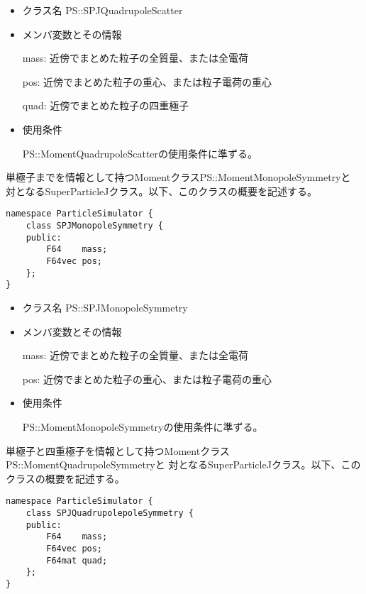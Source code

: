 \begin{itemize}
\item クラス名
  PS::SPJQuadrupoleScatter

\item メンバ変数とその情報

  mass: 近傍でまとめた粒子の全質量、または全電荷

  pos: 近傍でまとめた粒子の重心、または粒子電荷の重心
        
  quad: 近傍でまとめた粒子の四重極子

\item 使用条件

  PS::MomentQuadrupoleScatterの使用条件に準ずる。

\end{itemize}


\label{sec:SPJMonopoleSymmetry}

単極子までを情報として持つMomentクラスPS::MomentMonopoleSymmetryと
対となるSuperParticleJクラス。以下、このクラスの概要を記述する。
\begin{screen}
\begin{verbatim}
namespace ParticleSimulator {
    class SPJMonopoleSymmetry {
    public:
        F64    mass;
        F64vec pos;
    };
}
\end{verbatim}
\end{screen}

\begin{itemize}
\item クラス名
  PS::SPJMonopoleSymmetry

\item メンバ変数とその情報

  mass: 近傍でまとめた粒子の全質量、または全電荷

  pos: 近傍でまとめた粒子の重心、または粒子電荷の重心

\item 使用条件

  PS::MomentMonopoleSymmetryの使用条件に準ずる。

\end{itemize}

\label{sec:SPJQuadrupoleSymmetry}

単極子と四重極子を情報として持つMomentクラスPS::MomentQuadrupoleSymmetryと
対となるSuperParticleJクラス。以下、このクラスの概要を記述する。
\begin{screen}
\begin{verbatim}
namespace ParticleSimulator {
    class SPJQuadrupolepoleSymmetry {
    public:
        F64    mass;
        F64vec pos;
        F64mat quad;
    };
}
\end{verbatim}
\end{screen}

